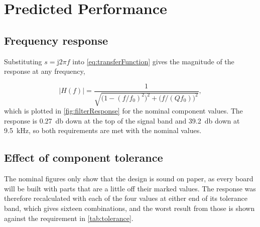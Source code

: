 
\section{Predicted Performance}
\label{sec:performance}

\subsection{Frequency response}

Substituting $s = \mathrm{j}2\pi f$ into \cref{eq:transferFunction} gives the
magnitude of the response at any frequency,

\begin{equation}
  \label{eq:magnitude}
  \lvert H(f) \rvert =
  \frac{1}{\sqrt{\bigl(1 - (f/f_0)^2\bigr)^2 + \bigl(f/(Q f_0)\bigr)^2}},
\end{equation}
which is plotted in \cref{fig:filterResponse} for the nominal component
values. The response is \qty{0.27}{\decibel} down at the top of the signal
band and \qty{39.2}{\decibel} down at \qty{9.5}{\kilo\hertz}, so both
requirements are met with the nominal values.



\subsection{Effect of component tolerance}

The nominal figures only show that the design is sound on paper, as every
board will be built with parts that are a little off their marked values. The
response was therefore recalculated with each of the four values at either
end of its tolerance band, which gives sixteen combinations, and the worst
result from those is shown against the requirement in \cref{tab:tolerance}.

